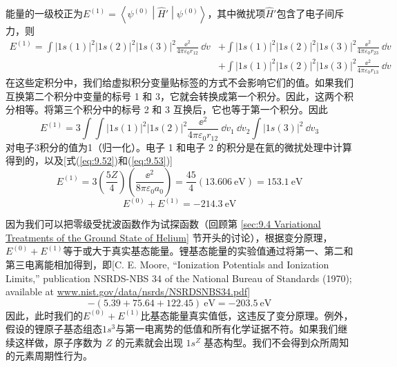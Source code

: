     能量的一级校正为$E^{\left(1\right)} = \left\langle \psi^{\left(0\right)} \middle| \hat{H}' \middle| \psi^{\left(0\right)} \right\rangle$，其中微扰项$\hat{H}'$包含了电子间斥力，则
    \begin{equation*}
        \begin{aligned}
            E^{\left(1\right)} = \int \left|1s\left(1\right)\right|^2 \left|1s\left(2\right)\right|^2 \left|1s\left(3\right)\right|^2 \frac{\ee ^2}{4\pi\varepsilon_0 r_{12}} \:\dd v &+ \int \left|1s\left(1\right)\right|^2 \left|1s\left(2\right)\right|^2 \left|1s\left(3\right)\right|^2 \frac{\ee ^2}{4\pi\varepsilon_0 r_{23}} \:\dd v \\
            &+ \int \left|1s\left(1\right)\right|^2 \left|1s\left(2\right)\right|^2 \left|1s\left(3\right)\right|^2 \frac{\ee ^2}{4\pi\varepsilon_0 r_{13}} \:\dd v
        \end{aligned}
    \end{equation*}
    在这些定积分中，我们给虚拟积分变量贴标签的方式不会影响它们的值。如果我们互换第二个积分中变量的标号 1 和 3，它就会转换成第一个积分。因此，这两个积分相等。将第三个积分中的标号 2 和 3 互换后，它也等于第一个积分。因此
    \begin{equation*}
        E^{\left(1\right)} = 3 \int \int \left|1s\left(1\right)\right|^2 \left|1s\left(2\right)\right|^2 \frac{\ee ^2}{4\pi \varepsilon_0 r_{12}} \:\dd v_1\: \dd v_2 \int \left|1s\left(3\right)\right|^2 \:\dd v_3
    \end{equation*}
    对电子3积分的值为1（归一化）。电子 1 和电子 2 的积分是在氦的微扰处理中计算得到的，以及[式(\ref{eq:9.52})和(\ref{eq:9.53})]
    \begin{equation*}
        E^{\left(1\right)} = 3\left(\frac{5Z}{4}\right)\left(\frac{\ee ^2}{8\pi \varepsilon_0a_0}\right) = \frac{45}{4} \left(13.606 \: \mathrm{eV}\right) = 153.1 \: \mathrm{eV}
    \end{equation*}
    \begin{equation*}
        E^{\left(0\right)} + E^{\left(1\right)} = -214.3 \: \mathrm{eV}
    \end{equation*}

    因为我们可以把零级受扰波函数作为试探函数（回顾第 \ref{sec:9.4 Variational Treatments of the Ground State of Helium} 节开头的讨论），根据变分原理，$E^{\left(0\right)} + E^{\left(1\right)}$等于或大于真实基态能量。锂基态能量的实验值通过将第一、第二和第三电离能相加得到，即[C. E. Moore, “Ionization Potentials and Ionization Limits,” publication NSRDS-NBS 34 of the National Bureau of Standards (1970); available at \url{www.nist.gov/data/nsrds/NSRDSNBS34.pdf}]
    \begin{equation*}
        -\left(5.39 + 75.64 + 122.45\right) \: \mathrm{eV} = -203.5 \: \mathrm{eV}
    \end{equation*}
    因此，此时我们的$E^{\left(0\right)} + E^{\left(1\right)}$比基态能量真实值低，这违反了变分原理。例外，假设的锂原子基态组态$1s^3$与第一电离势的低值和所有化学证据不符。如果我们继续这样做，原子序数为 $Z$ 的元素就会出现 $1s^Z$ 基态构型。我们不会得到众所周知的元素周期性行为。

